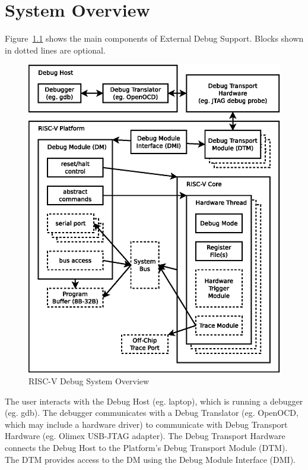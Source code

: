 \chapter{System Overview} \label{overview}

Figure~\ref{fig:overview} shows the main components of External Debug Support.
Blocks shown in dotted lines are optional. 

\begin{figure}
   \centering
   \includegraphics[width=\textwidth]{fig/overview.eps}
   \caption{RISC-V Debug System Overview}
   \label{fig:overview}
\end{figure}

The user interacts with the Debug Host (eg. laptop), which is running a
debugger (eg. gdb).  The debugger communicates with a Debug Translator (eg.
OpenOCD, which may include a hardware driver) to communicate with Debug
Transport Hardware (eg.  Olimex USB-JTAG adapter).
The Debug Transport Hardware connects the Debug Host to the Platform's Debug
Transport Module (DTM).  The DTM provides access to the DM using the Debug
Module Interface (DMI).

